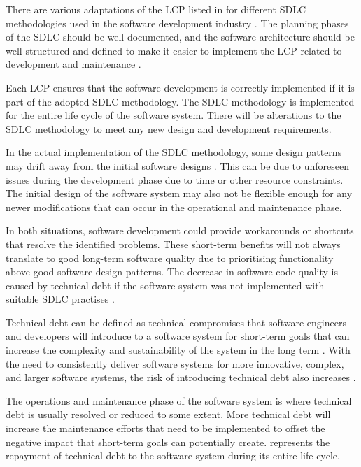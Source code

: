 There are various adaptations of the LCP listed in  for different SDLC methodologies used in the software development industry \cite{Al-Saiyd2015}. The planning phases of the SDLC should be well-documented, and the software architecture should be well structured and defined to make it easier to implement the LCP related to development and maintenance \cite{Ackermann2009}.\par Each LCP ensures that the software development is correctly implemented if it is part of the adopted SDLC methodology. The SDLC methodology is implemented for the entire life cycle of the software system. There will be alterations to the SDLC methodology to meet any new design and development requirements.\par In the actual implementation of the SDLC methodology, some design patterns may drift away from the initial software designs \cite{Reimanis2016}. This can be due to unforeseen issues during the development phase due to time or other resource constraints. The initial design of the software system may also not be flexible enough for any newer modifications that can occur in the operational and maintenance phase.\par In both situations, software development could provide workarounds or shortcuts that resolve the identified problems. These short-term benefits will not always translate to good long-term software quality due to prioritising functionality above good software design patterns. The decrease in software code quality is caused by technical debt if the software system was not implemented with suitable SDLC practises \cite{DeLeon-Sigg2020, Reimanis2016}.\par Technical debt can be defined as technical compromises that software engineers and developers will introduce to a software system for short-term goals that can increase the complexity and sustainability of the system in the long term \cite{Snipes2018, Gralha2018}. With the need to consistently deliver software systems for more innovative, complex, and larger software systems, the risk of introducing technical debt also increases \cite{Reimanis2016, Khan2013}.\par The operations and maintenance phase of the software system is where technical debt is usually resolved or reduced to some extent. More technical debt will increase the maintenance efforts that need to be implemented to offset the negative impact that short-term goals can potentially create.  represents the repayment of technical debt to the software system during its entire life cycle.

